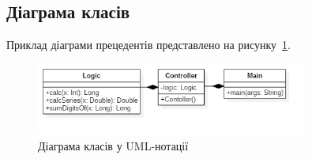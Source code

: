 \subsection{Діаграма класів}
Приклад діаграми прецедентів представлено на рисунку~\ref{fig:uml_class}.

\begin{figure}[H]
  \centering
    \includegraphics[width=0.8\textwidth]{uml_class}
  \caption{Діаграма класів у UML-нотації}
  \label{fig:uml_class}
\end{figure}


